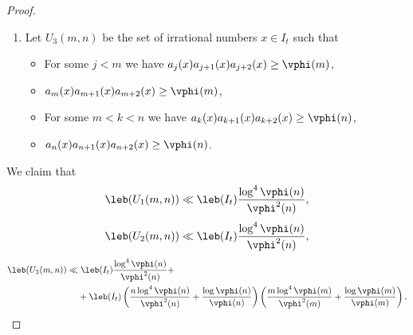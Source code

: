 \documentclass[12pt,a4paper]{amsart}
\begin{document}
\begin{proof}
\begin{enumerate}[1.]
\item Let $U_3(m,n)$ be the set of irrational numbers $x \in I_t$ such that
\begin{itemize}
\item[•] For some $j<m$ we have $a_{j}(x)a_{j+1}(x)a_{j+2}(x)\geq \vphi(m)$,
\item[•] $a_{m}(x)a_{m+1}(x) a_{m + 2}(x)\geq \vphi(m)$,
\item[•] For some $m<k<n$ we have $a_{k}(x)a_{k+1}(x)a_{k+2}(x) \geq \vphi(n)$,
\item[•] $a_n(x) a_{n + 1}(x)a_{n + 2}(x)\geq \vphi(n)$.
\end{itemize}
\end{enumerate}
We claim that
\begin{equation}\label{Eq:EstU1}
\leb(U_1(m,n))
\ll
\leb(I_t) \frac{\log^{4}\vphi(n)}{\vphi^2(n)},    
\end{equation}
\begin{equation}\label{Eq:EstU2}
\leb(U_2(m,n))
\ll
\leb(I_t) \frac{\log^{4}\vphi(n)}{\vphi^2(n)}, 
\end{equation}
\begin{align}\label{Eq:EstU3}
\leb(U_3(m,n))
&\ll
\leb(I_t)
\frac{\log^{4}\vphi(n)}{\vphi^2(n)}  +\nonumber\\
&\quad\; + 
\leb(I_t)\left( \frac{n\log^{4}  \vphi(n)}{\vphi^2(n)} 
+ \frac{\log \vphi(n)}{\vphi(n)} \right)
\left( \frac{m\log^{4}  \vphi(m)}{\vphi^2(m)} + \frac{\log \vphi(m)}{\vphi(m)} \right).
\end{align}


\end{proof}
\end{document}
